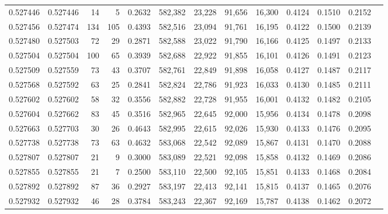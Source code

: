 \begin{tabular}{rrrrrrrrrrrrr}
0.527446 & 0.527446 &    14 &     5 &                                     0.2632 & 582,382 &  23,228 &  91,656 &  16,300 & 0.4124 & 0.1510 & 0.2152 \\
0.527456 & 0.527474 &   134 &   105 &                                     0.4393 & 582,516 &  23,094 &  91,761 &  16,195 & 0.4122 & 0.1500 & 0.2139 \\
0.527480 & 0.527503 &    72 &    29 &                                     0.2871 & 582,588 &  23,022 &  91,790 &  16,166 & 0.4125 & 0.1497 & 0.2133 \\
0.527504 & 0.527504 &   100 &    65 &                                     0.3939 & 582,688 &  22,922 &  91,855 &  16,101 & 0.4126 & 0.1491 & 0.2123 \\
0.527509 & 0.527559 &    73 &    43 &                                     0.3707 & 582,761 &  22,849 &  91,898 &  16,058 & 0.4127 & 0.1487 & 0.2117 \\
0.527568 & 0.527592 &    63 &    25 &                                     0.2841 & 582,824 &  22,786 &  91,923 &  16,033 & 0.4130 & 0.1485 & 0.2111 \\
0.527602 & 0.527602 &    58 &    32 &                                     0.3556 & 582,882 &  22,728 &  91,955 &  16,001 & 0.4132 & 0.1482 & 0.2105 \\
0.527604 & 0.527662 &    83 &    45 &                                     0.3516 & 582,965 &  22,645 &  92,000 &  15,956 & 0.4134 & 0.1478 & 0.2098 \\
0.527663 & 0.527703 &    30 &    26 &                                     0.4643 & 582,995 &  22,615 &  92,026 &  15,930 & 0.4133 & 0.1476 & 0.2095 \\
0.527738 & 0.527738 &    73 &    63 &                                     0.4632 & 583,068 &  22,542 &  92,089 &  15,867 & 0.4131 & 0.1470 & 0.2088 \\
0.527807 & 0.527807 &    21 &     9 &                                     0.3000 & 583,089 &  22,521 &  92,098 &  15,858 & 0.4132 & 0.1469 & 0.2086 \\
0.527855 & 0.527855 &    21 &     7 &                                     0.2500 & 583,110 &  22,500 &  92,105 &  15,851 & 0.4133 & 0.1468 & 0.2084 \\
0.527892 & 0.527892 &    87 &    36 &                                     0.2927 & 583,197 &  22,413 &  92,141 &  15,815 & 0.4137 & 0.1465 & 0.2076 \\
0.527932 & 0.527932 &    46 &    28 &                                     0.3784 & 583,243 &  22,367 &  92,169 &  15,787 & 0.4138 & 0.1462 & 0.2072 \\

\end{tabular}
